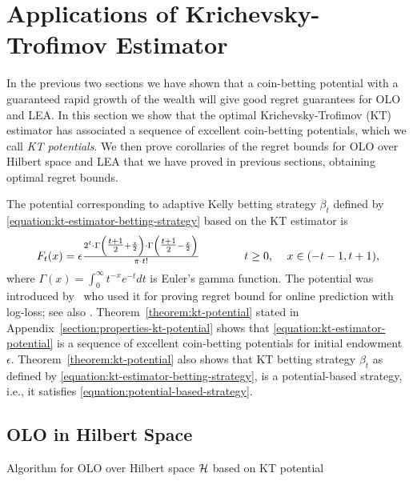 \section{Applications of Krichevsky-Trofimov Estimator}
\label{section:kt-estimator}

In the previous two sections we have shown that a coin-betting potential with a
guaranteed rapid growth of the wealth will give good regret guarantees for
\ac{OLO} and \ac{LEA}. In this section we show that the optimal
Krichevsky-Trofimov (KT) estimator has associated a sequence of excellent
coin-betting potentials, which we call \emph{KT potentials}. We then prove
corollaries of the regret bounds for \ac{OLO} over Hilbert space and \ac{LEA}
that we have proved in previous sections, obtaining optimal regret bounds.

The potential corresponding to adaptive Kelly betting strategy
$\beta_t$ defined by \eqref{equation:kt-estimator-betting-strategy}
based on the KT estimator is
\begin{equation}
\label{equation:kt-estimator-potential}
F_t(x) = \epsilon \tfrac{2^t \cdot \Gamma \left( \tfrac{t+1}{2} + \frac{x}{2} \right) \cdot \Gamma \left( \tfrac{t+1}{2} - \frac{x}{2} \right)}{\pi \cdot t!}
\qquad \qquad \text{$t \ge 0$, \quad $x \in \left(-t-1, t+1\right)$,}
\end{equation}
where $\Gamma(x) = \int_0^\infty t^{-x} e^{-t} dt$ is Euler's gamma function.
The potential was introduced by~\citet{KrichevskyT81} who used it for proving
regret bound for online prediction with log-loss; see also \cite[Section
9.7]{Cesa-BianchiL06}.
Theorem~\ref{theorem:kt-potential} stated in
Appendix~\ref{section:properties-kt-potential} shows that
\eqref{equation:kt-estimator-potential} is a sequence of excellent coin-betting
potentials for initial endowment $\epsilon$. Theorem~\ref{theorem:kt-potential}
also shows that KT betting strategy $\beta_t$ as defined by
\eqref{equation:kt-estimator-betting-strategy}, is a potential-based strategy,
i.e., it satisfies \eqref{equation:potential-based-strategy}.

\subsection{OLO in Hilbert Space}
\label{sec:kt-olo}

\begin{algorithm}[t]
\caption{Algorithm for OLO over Hilbert space $\mathcal{H}$ based on KT potential
\label{algorithm:kt-hilbert-space-olo}}
\begin{algorithmic}[1]
{
\ENDFOR
}
\end{algorithmic}
\end{algorithm}


